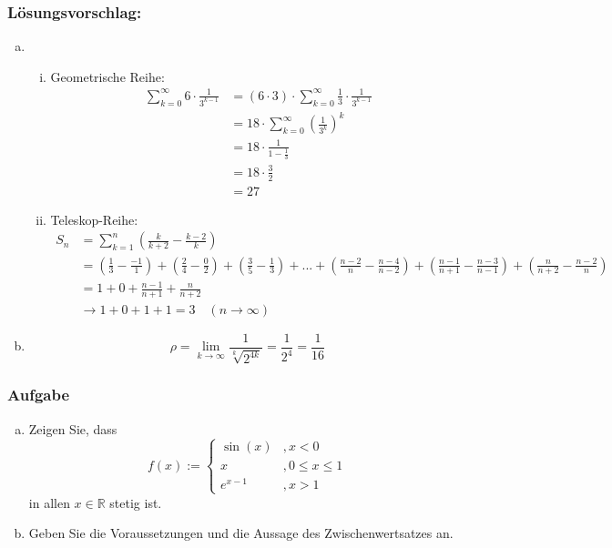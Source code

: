\documentclass[a4paper,11pt]{scrartcl}
\newcounter{auf}
\newcommand{\Aufgabe}%
        {\addtocounter{auf}{1} \subsubsection*{\rmfamily  Aufgabe \theauf \hspace{1em}} }
\newcommand{\RR}{\mathbb{R}}
\begin{document}
\subsubsection*{Lösungsvorschlag:}
\begin{enumerate}[a)]
\item
	\begin{enumerate}[i)] \item Geometrische Reihe:
	\begin{align*}
	\sum \limits_{k=0}^\infty 6\cdot \frac{1}{3^{k-1}}&=(6\cdot 3)  \cdot \sum \limits_{k=0}^\infty \frac{1}{3}\cdot \frac{1}{3^{k-1}}\\
	&=18 \cdot \sum \limits_{k=0}^\infty \left(\frac{1}{3^{k}}\right)^{k}\\
	&=18 \cdot \frac{1}{1-\frac{1}{3}}\\
	&=18 \cdot \frac{3}{2}\\
	&=27
	\end{align*}
	\item Teleskop-Reihe:
	 \begin{align*}
	S_n&=\sum \limits_{k=1}^n\left( \frac{k}{k+2}-\frac{k-2}{k}\right)\\
	&=(\frac{1}{3}-\frac{-1}{1})+(\frac{2}{4}-\frac{0}{2})+(\frac{3}{5}-\frac{1}{3})+...+(\frac{n-2}{n}-\frac{n-4}{n-2})+(\frac{n-1}{n+1}-\frac{n-3}{n-1})+(\frac{n}{n+2}-\frac{n-2}{n})\\
	&=1+0+\frac{n-1}{n+1}+\frac{n}{n+2}\\
	&\to 1+0+1+1 = 3 \quad (n \to \infty)
	\end{align*}
	\end{enumerate}
\item 
$$
\rho = \lim_{k\to \infty} \frac{1}{\sqrt[k]{2^{4k}}}=\frac{1}{2^4}=\frac{1}{16}
$$
\end{enumerate}

\newpage
\Aufgabe 
\begin{enumerate}[a)]
\item Zeigen Sie, dass 
$$
f(x):= \begin{cases} \sin(x) &, x<0\\ x &, 0\le x\le 1 \\ e^{x-1} &, x>1   \end{cases}
$$
in allen $x \in \RR$ stetig ist.
\item Geben Sie die Voraussetzungen und die Aussage des Zwischenwertsatzes an.

\end{enumerate}
%
%
\end{document}
